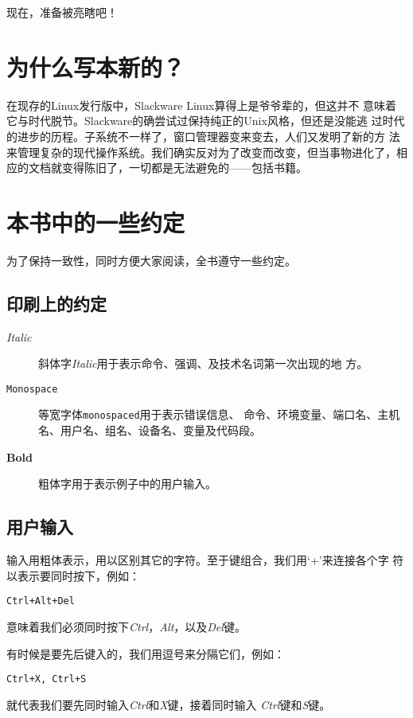 现在，准备被亮瞎吧！

\section*{为什么写本新的？}
\label{sec:preface:whyANewSlackwareBook}
在现存的Linux发行版中，Slackware Linux算得上是爷爷辈的，但这并不
意味着它与时代脱节。Slackware的确尝试过保持纯正的Unix风格，但还是没能逃
过时代的进步的历程。子系统不一样了，窗口管理器变来变去，人们又发明了新的方
法来管理复杂的现代操作系统。我们确实反对为了改变而改变，但当事物进化了，相
应的文档就变得陈旧了，一切都是无法避免的——包括书籍。

\section*{本书中的一些约定}
\label{sec:preface:conventionsUsedInThisBook}

为了保持一致性，同时方便大家阅读，全书遵守一些约定。

\subsection*{印刷上的约定}
\label{sec:preface:conventions:typographic}

\begin{description}
\item[\textit{Italic}] 斜体字\textit{Italic}用于表示命令、强调、及技术名词第一次出现的地
  方。
\item[\texttt{Monospace}] 等宽字体\texttt{monospaced}用于表示错误信息、
  命令、环境变量、端口名、主机名、用户名、组名、设备名、变量及代码段。
\item[\textbf{Bold}] 粗体字用于表示例子中的用户输入。
\end{description}

\subsection*{用户输入}
\label{sec:preface:conventions:userInput}

输入用粗体表示，用以区别其它的字符。至于键组合，我们用`+'来连接各个字
符以表示要同时按下，例如：
\begin{Verbatim}[frame=single]
Ctrl+Alt+Del
\end{Verbatim}
意味着我们必须同时按下\textit{Ctrl}，\textit{Alt}，以及\textit{Del}键。

有时候是要先后键入的，我们用逗号来分隔它们，例如：
\begin{Verbatim}[frame=single]
Ctrl+X, Ctrl+S
\end{Verbatim}
就代表我们要先同时输入\textit{Ctrl}和\textit{X}键，接着同时输入
\textit{Ctrl}键和\textit{S}键。

